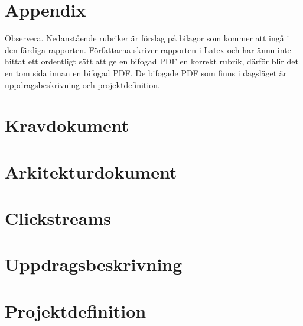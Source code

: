 \documentclass[a4paper]{article}
\begin{document}
\section{Appendix}
\begin{appendices}
Observera.
Nedanstående rubriker är förslag på bilagor som kommer att ingå i den färdiga rapporten. Författarna skriver rapporten i Latex och har ännu inte hittat ett ordentligt sätt att ge en bifogad PDF en korrekt rubrik, därför blir det en tom sida innan en bifogad PDF. De bifogade PDF som finns i dagsläget är uppdragsbeskrivning och projektdefinition.
\section{Kravdokument}
\label{appendix:kravdokument}
\section{Arkitekturdokument}
\label{appendix:arkitekturdokument}
\section{Clickstreams}
\label{appendix:clickstreams}
\section{Uppdragsbeskrivning}
\label{appendix:uppdragsbeskrivning}
%
\section{Projektdefinition}
\label{appendix:projektdef}
%
\end{appendices}
\end{document}
